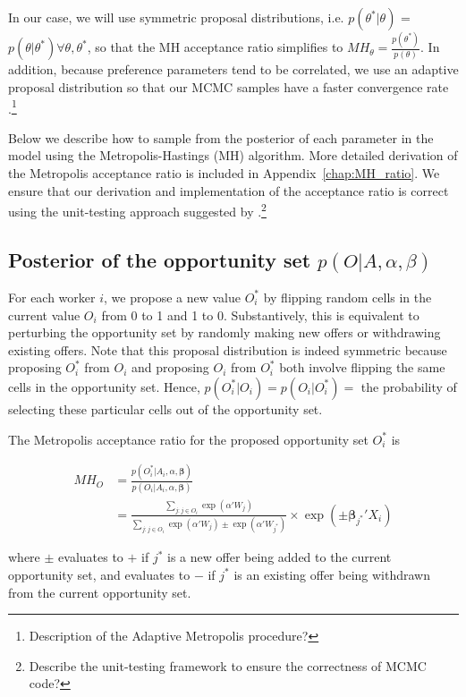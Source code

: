 In our case, we will use symmetric proposal distributions, i.e.
$p(\theta^*|\theta)$ = $p(\theta | \theta^*) \forall \theta, \theta^*$, so that
the MH acceptance ratio simplifies to $MH_{\theta} =
\frac{p(\theta^*)}{p(\theta)}$. In addition, because preference parameters tend
to be correlated, we use an adaptive proposal distribution so that our MCMC
samples have a faster convergence rate \citep{Haario1999, Haario2001}.\footnote{Description
  of the Adaptive Metropolis procedure?}

Below we describe how to sample from the posterior of each parameter in the
model using the Metropolis-Hastings (MH) algorithm. More detailed derivation of
the Metropolis acceptance ratio is included in Appendix~\ref{chap:MH_ratio}. We
ensure that our derivation and implementation of the acceptance ratio is correct
using the unit-testing approach suggested by
\citet{Grosse2014}.\footnote{Describe the unit-testing framework to ensure the
  correctness of MCMC code?}

\subsection{Posterior of the opportunity set $p(O|A, \alpha, \beta)$}

For each worker $i$, we propose a new value $O_i^*$ by flipping random cells in
the current value $O_i$ from 0 to 1 and 1 to 0. Substantively, this is
equivalent to perturbing the opportunity set by randomly making new offers or
withdrawing existing offers. Note that this proposal distribution is indeed
symmetric because proposing $O_i^*$ from $O_i$ and proposing $O_i$ from $O_i^*$
both involve flipping the same cells in the opportunity set. Hence,
$p(O_i^*|O_i) = p(O_i|O_i^*) =$ the probability of selecting these particular
cells out of the opportunity set.

The Metropolis acceptance ratio for the proposed opportunity set $O_i^*$ is

\begin{align}
  MH_O &= \frac{p(O_i^* | A_i, \alpha, \bm{\beta})}{p(O_i | A_i, \alpha, \bm{\beta})} \\
       &= \frac{\sum\limits_{j:j \in O_i} \exp(\alpha'W_j)}{\sum\limits_{j:j \in O_i} \exp(\alpha'W_j) \pm \exp(\alpha' W_{j^*})} \times \exp(\pm \bm{\beta}_{j^*}'X_i)
\end{align}

where $\pm$ evaluates to $+$ if $j^*$ is a new offer being added to the current
opportunity set, and evaluates to $-$ if $j^*$ is an existing offer being withdrawn from
the current opportunity set.

